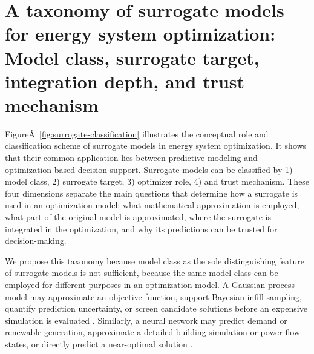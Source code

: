 \section{A taxonomy of surrogate models for energy system optimization: Model class, surrogate target, integration depth, and trust mechanism}
\label{sec:taxonomy}

FigureÂ~\ref{fig:surrogate-classification} illustrates the conceptual
role and classification scheme of surrogate models in energy system
optimization. It shows that their common application lies between
predictive modeling and optimization-based decision support. Surrogate
models can be classified by 1) model class, 2) surrogate target, 3)
optimizer role, 4) and trust mechanism. These four dimensions separate
the main questions that determine how a surrogate is used in an
optimization model: what mathematical approximation is employed, what
part of the original model is approximated, where the surrogate is
integrated in the optimization, and why its predictions can be trusted
for decision-making.

We propose this taxonomy because model class as the sole distinguishing
feature of surrogate models is not sufficient, because the same model
class can be employed for different purposes in an optimization model. A
Gaussian-process model may approximate an objective function, support
Bayesian infill sampling, quantify prediction uncertainty, or screen
candidate solutions before an expensive simulation is evaluated
\cite{Hu2020,Hu2021671,Volodina2022,Schulte2020}.
Similarly, a neural network may predict demand or renewable generation,
approximate a detailed building simulation or power-flow states, or
directly predict a near-optimal solution
\cite{Ruan2021221,Khaloie2025,Lim2025,Wu2022231,Chen2022,Chen20244723,Li202359995}.

